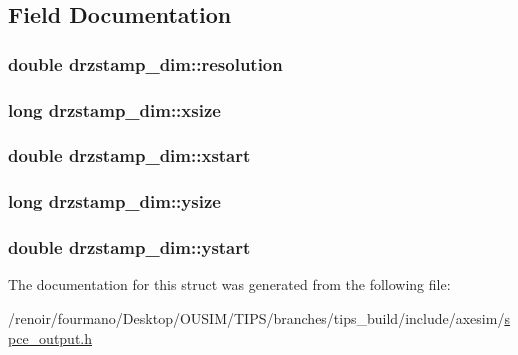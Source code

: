 \subsection{Field Documentation}
\hypertarget{structdrzstamp__dim_ab3c0ed305132ecda42a1e8b6dad5ce27}{
\subsubsection[{resolution}]{\setlength{\rightskip}{0pt plus 5cm}double {\bf drzstamp\_\-dim::resolution}}}
\label{structdrzstamp__dim_ab3c0ed305132ecda42a1e8b6dad5ce27}
\hypertarget{structdrzstamp__dim_a459626637b5697c339db9e2b31f3ded6}{
\subsubsection[{xsize}]{\setlength{\rightskip}{0pt plus 5cm}long {\bf drzstamp\_\-dim::xsize}}}
\label{structdrzstamp__dim_a459626637b5697c339db9e2b31f3ded6}
\hypertarget{structdrzstamp__dim_af6df14c21230e289ef6abe7134de3cc3}{
\subsubsection[{xstart}]{\setlength{\rightskip}{0pt plus 5cm}double {\bf drzstamp\_\-dim::xstart}}}
\label{structdrzstamp__dim_af6df14c21230e289ef6abe7134de3cc3}
\hypertarget{structdrzstamp__dim_a8e268f2124d4cc8783fe4f37708bbe8f}{
\subsubsection[{ysize}]{\setlength{\rightskip}{0pt plus 5cm}long {\bf drzstamp\_\-dim::ysize}}}
\label{structdrzstamp__dim_a8e268f2124d4cc8783fe4f37708bbe8f}
\hypertarget{structdrzstamp__dim_a9ed53e0c679cabe8bd15189b7b9b7a62}{
\subsubsection[{ystart}]{\setlength{\rightskip}{0pt plus 5cm}double {\bf drzstamp\_\-dim::ystart}}}
\label{structdrzstamp__dim_a9ed53e0c679cabe8bd15189b7b9b7a62}


The documentation for this struct was generated from the following file:\begin{DoxyCompactItemize}
\item 
/renoir/fourmano/Desktop/OUSIM/TIPS/branches/tips\_\-build/include/axesim/\hyperlink{spce__output_8h}{spce\_\-output.h}\end{DoxyCompactItemize}
